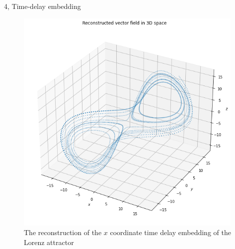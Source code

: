 \documentclass[10pt,a4paper]{article}
\begin{document}
\begin{task}{4, Time-delay embedding}
\begin{figure}[H]
    \centering
    \includegraphics[width=11cm]{images/task4-3-2.png}
    \caption{The reconstruction of the $x$ coordinate time delay embedding of the Lorenz attractor}
    \label{task4-3-2}
\end{figure}

\end{task}

\newpage
\end{document}
